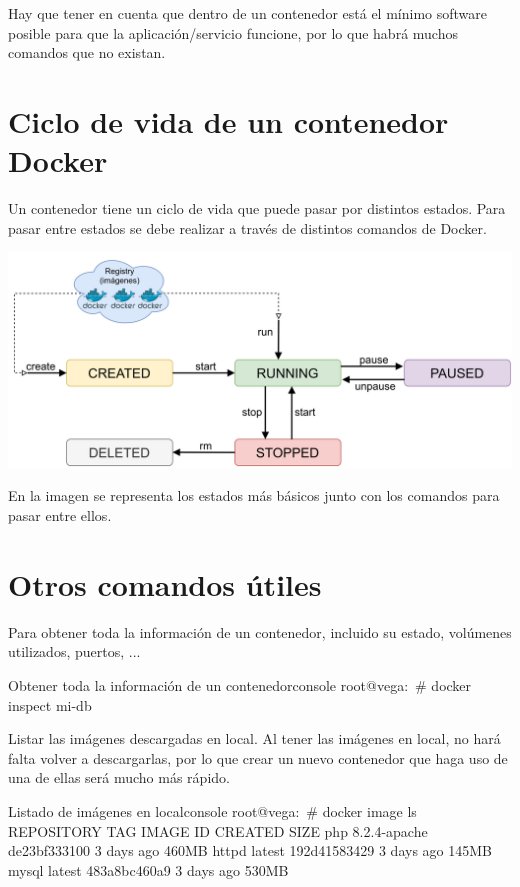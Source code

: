 Hay que tener en cuenta que dentro de un contenedor está el mínimo software posible para que la aplicación/servicio funcione, por lo que habrá muchos comandos que no existan.


\section{Ciclo de vida de un contenedor Docker}
Un contenedor tiene un ciclo de vida que puede pasar por distintos estados. Para pasar entre estados se debe realizar a través de distintos comandos de Docker.

\begin{center}
    \includegraphics[width=\linewidth]{img/docker/lifecycle.png}
\end{center}

En la imagen se representa los estados más básicos junto con los comandos para pasar entre ellos.


\section{Otros comandos útiles}

Para obtener toda la información de un contenedor, incluido su estado, volúmenes utilizados, puertos, ...

\begin{mycode}{Obtener toda la información de un contenedor}{console}{}
root@vega:~# docker inspect mi-db
\end{mycode}

Listar las imágenes descargadas en local. Al tener las imágenes en local, no hará falta volver a descargarlas, por lo que crear un nuevo contenedor que haga uso de una de ellas será mucho más rápido.

\begin{mycode}{Listado de imágenes en local}{console}{}
root@vega:~# docker image ls
REPOSITORY       TAG            IMAGE ID       CREATED        SIZE
php              8.2.4-apache   de23bf333100   3 days ago     460MB
httpd            latest         192d41583429   3 days ago     145MB
mysql            latest         483a8bc460a9   3 days ago     530MB
\end{mycode}


